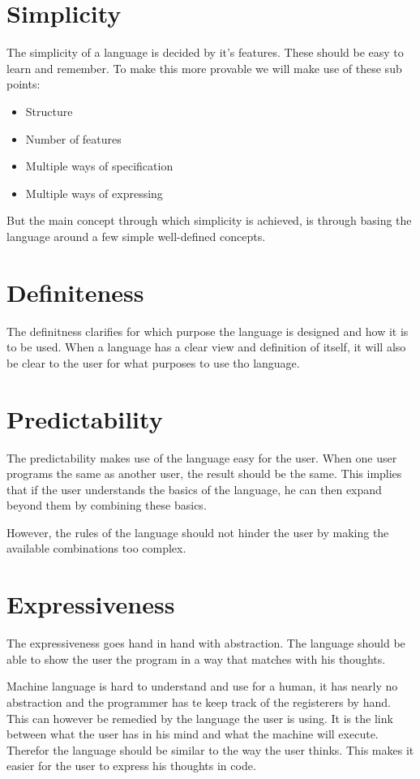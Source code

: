 \section{Simplicity}
The simplicity of a language is decided by it's features.
These should be easy to learn and remember.
To make this more provable we will make use of these sub points:
\begin{itemize}[noitemsep]
   \item Structure
   \item Number of features
   \item Multiple ways of specification
   \item Multiple ways of expressing
\end{itemize}

But the main concept through which simplicity is achieved, is through basing the language around a few simple well-defined concepts.
\cite{khedker1997makes}

\section{Definiteness}
The definitness clarifies for which purpose the language is designed and how it is to be used.
When a language has a clear view and definition of itself, it will also be clear to the user for what purposes to use tho language.

\section{Predictability}
The predictability makes use of the language easy for the user.
When one user programs the same as another user, the result should be the same.
This implies that if the user understands the basics of the language, he can then expand beyond them by combining these basics.

However, the rules of the language should not hinder the user by making the available combinations too complex.

\section{Expressiveness}
The expressiveness goes hand in hand with abstraction.
The language should be able to show the user the program in a way that matches with his thoughts.

Machine language is hard to understand and use for a human, it has nearly no abstraction and the programmer has te keep track of the registerers by hand.
This can however be remedied by the language the user is using.
It is the link between what the user has in his mind and what the machine will execute.
Therefor the language should be similar to the way the user thinks.
This makes it easier for the user to express his thoughts in code.

